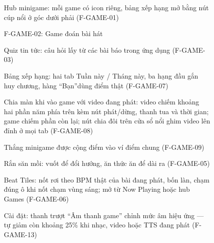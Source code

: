 \begin{figure}[H]
\centering
{}
\caption{\small Hub minigame: mỗi game có icon riêng, bảng xếp hạng mở bằng nút cúp nổi ở góc dưới phải (F-GAME-01)}
\end{figure}
\begin{figure}[H]
\centering
{}
\caption{\small F-GAME-02: Game đoán bài hát}
\end{figure}
\begin{figure}[H]
\centering
{}
\caption{\small Quiz tin tức: câu hỏi lấy từ các bài báo trong ứng dụng (F-GAME-03)}
\end{figure}
\begin{figure}[H]
\centering
{}
\caption{\small Bảng xếp hạng: hai tab Tuần này / Tháng này, ba hạng đầu gắn huy chương, hàng ``Bạn''dùng điểm thật (F-GAME-07)}
\end{figure}
\begin{figure}[H]
\centering
{}
\caption{\small Chia màn khi vào game với video đang phát: video chiếm khoảng hai phần năm phía trên kèm nút phát/dừng, thanh tua và thời gian; game chiếm phần còn lại; nút chia đôi trên cửa sổ nổi ghim video lên đỉnh ở mọi tab (F-GAME-08)}
\end{figure}
\begin{figure}[H]
\centering
{}
\caption{\small Thắng minigame được cộng điểm vào ví điểm chung (F-GAME-09)}
\end{figure}
\begin{figure}[H]
\centering
{}
\caption{\small Rắn săn mồi: vuốt để đổi hướng, ăn thức ăn để dài ra (F-GAME-05)}
\end{figure}
\begin{figure}[H]
\centering
{}
\caption{\small Beat Tiles: nốt rơi theo BPM thật của bài đang phát, bốn làn, chạm đúng ô khi nốt chạm vùng sáng; mở từ Now Playing hoặc hub Games (F-GAME-06)}
\end{figure}
\begin{figure}[H]
\centering
{}
\caption{\small Cài đặt: thanh trượt ``Âm thanh game'' chỉnh mức âm hiệu ứng --- tự giảm còn khoảng 25\% khi nhạc, video hoặc TTS đang phát (F-GAME-13)}
\end{figure}
